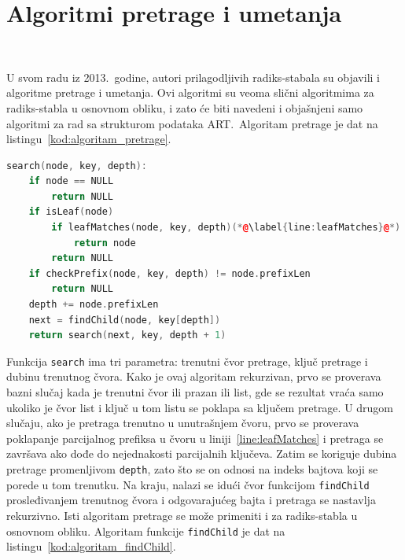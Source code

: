 \documentclass[12pt,oneside]{memoir}
\begin{document}
\section{Algoritmi pretrage i umetanja}~\label{sec:algoritmi_pretraga_umetanje}

U svom radu iz 2013.\ godine, autori prilagodljivih radiks-stabala su
objavili i algoritme pretrage i umetanja. Ovi algoritmi su veoma slični
algoritmima za radiks-stabla u osnovnom obliku, i zato će biti navedeni
i objašnjeni samo algoritmi za rad sa strukturom podataka ART.\
Algoritam pretrage je dat na listingu~\ref{kod:algoritam_pretrage}.

\begin{lstlisting}[language=C++,
                   caption={Algoritam pretrage strukture podataka ART},
                   label={kod:algoritam_pretrage}]
search(node, key, depth):
    if node == NULL
        return NULL
    if isLeaf(node)
        if leafMatches(node, key, depth)(*@\label{line:leafMatches}@*)
            return node
        return NULL
    if checkPrefix(node, key, depth) != node.prefixLen
        return NULL
    depth += node.prefixLen
    next = findChild(node, key[depth])
    return search(next, key, depth + 1)
\end{lstlisting}

Funkcija \texttt{search} ima tri parametra: trenutni čvor pretrage, ključ
pretrage i dubinu trenutnog čvora. Kako je ovaj algoritam rekurzivan,
prvo se proverava bazni slučaj kada je trenutni čvor ili prazan ili
list, gde se rezultat vraća samo ukoliko je čvor list i ključ u tom listu
se poklapa sa ključem pretrage. U drugom slučaju, ako je pretraga trenutno
u unutrašnjem čvoru, prvo se proverava poklapanje parcijalnog prefiksa
u čvoru u liniji~\ref{line:leafMatches} i pretraga se završava ako dođe
do nejednakosti parcijalnih ključeva. Zatim se koriguje dubina pretrage
promenljivom \texttt{depth},
zato što se on odnosi na indeks bajtova koji se
porede u tom trenutku.
Na kraju, nalazi se idući čvor funkcijom \texttt{findChild} prosleđivanjem
trenutnog čvora i odgovarajućeg bajta i pretraga se
nastavlja rekurzivno. Isti algoritam pretrage se može primeniti i za
radiks-stabla u osnovnom obliku. Algoritam funkcije
\texttt{findChild} je dat na listingu~\ref{kod:algoritam_findChild}.
\end{document}

